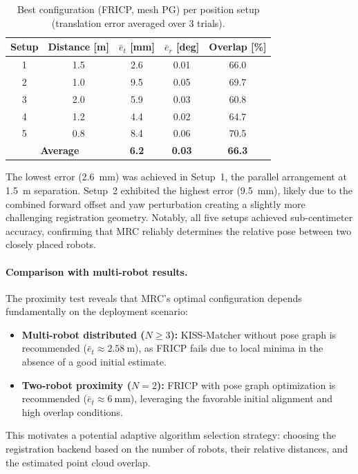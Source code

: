 \begin{table}[htbp]
    \centering
    \caption{Best configuration (FRICP, mesh PG) per position setup
             (translation error averaged over 3 trials).}
    \label{tab:proximity_per_setup}
    \small
    \begin{tabular}{c c c c c}
        \toprule
        \textbf{Setup}
            & \textbf{Distance} [m]
            & $\bar{e}_t$ [mm]
            & $\bar{e}_r$ [deg]
            & \textbf{Overlap} [\%] \\
        \midrule
        1 & 1.5  &  2.6  & 0.01  & 66.0 \\
        2 & 1.0  &  9.5  & 0.05  & 69.7 \\
        3 & 2.0  &  5.9  & 0.03  & 60.8 \\
        4 & 1.2  &  4.4  & 0.02  & 64.7 \\
        5 & 0.8  &  8.4  & 0.06  & 70.5 \\
        \midrule
        \multicolumn{2}{c}{\textbf{Average}} & \textbf{6.2} & \textbf{0.03} & \textbf{66.3} \\
        \bottomrule
    \end{tabular}
\end{table}

The lowest error (\SI{2.6}{\milli\metre}) was achieved in Setup~1,
the parallel arrangement at \SI{1.5}{\metre} separation.
Setup~2 exhibited the highest error (\SI{9.5}{\milli\metre}),
likely due to the combined forward offset and yaw perturbation
creating a slightly more challenging registration geometry.
Notably, all five setups achieved sub-centimeter accuracy,
confirming that MRC reliably determines the relative pose
between two closely placed robots.

\paragraph{Comparison with multi-robot results.}
The proximity test reveals that MRC's optimal configuration
depends fundamentally on the deployment scenario:
\begin{itemize}
    \item \textbf{Multi-robot distributed ($N \geq 3$):}
          KISS-Matcher without pose graph is recommended
          ($\bar{e}_t \approx \SI{2.58}{\metre}$), as FRICP
          fails due to local minima in the absence of a good
          initial estimate.
    \item \textbf{Two-robot proximity ($N = 2$):}
          FRICP with pose graph optimization is recommended
          ($\bar{e}_t \approx \SI{6}{\milli\metre}$), leveraging
          the favorable initial alignment and high overlap
          conditions.
\end{itemize}
This motivates a potential adaptive algorithm selection strategy:
choosing the registration backend based on the number of robots,
their relative distances, and the estimated point cloud overlap.

